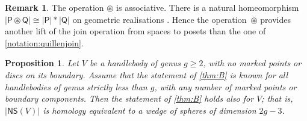 \documentclass[JEP,XML,SOM,Unicode,NoFloatCountersInSection,published]{cedram}
\theoremstyle{plain}
\newtheorem{prop}[thm]{Proposition}
\theoremstyle{definition}
\newtheorem{rem}[thm]{Remark}
\let\altjoin\circledast
\newcommand{\NS}{\mathsf{NS}}
\begin{document}
\begin{rem}
The operation $\altjoin$ is associative. There is a natural homeomorphism $|\mathsf P \altjoin \mathsf Q| \cong |\mathsf P| \ast |\mathsf Q|$ on geometric realisations \cite[Prop.\,1.9]{quillen-homotopyproperties}. Hence the operation~$\altjoin$ provides another lift of the join operation from spaces to posets than the one of \cref{notation:quillenjoin}.
\end{rem}

\begin{prop}\label{final prop}Let $V$ be a handlebody of genus $g \geq 2$, with no marked points or discs on its boundary. Assume that the statement of \cref{thm:B} is known for all handlebodies of genus strictly less than $g$, with any number of marked points or boundary components. Then the statement of \cref{thm:B} holds also for $V$; that is, $|\NS(V)|$ is homology equivalent to a wedge of spheres of dimension $2g-3$.
\end{prop}
\end{document}

